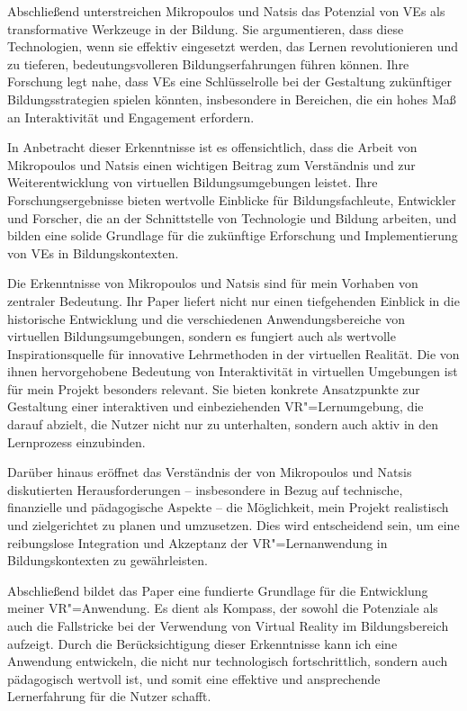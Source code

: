 \documentclass[draft]{vutinfth} %
\begin{document}
Abschließend unterstreichen Mikropoulos und Natsis das Potenzial von VEs als transformative Werkzeuge in der Bildung. Sie argumentieren, dass diese Technologien, wenn sie effektiv eingesetzt werden, das Lernen revolutionieren und zu tieferen, bedeutungsvolleren Bildungserfahrungen führen können. Ihre Forschung legt nahe, dass VEs eine Schlüsselrolle bei der Gestaltung zukünftiger Bildungsstrategien spielen könnten, insbesondere in Bereichen, die ein hohes Maß an Interaktivität und Engagement erfordern.

In Anbetracht dieser Erkenntnisse ist es offensichtlich, dass die Arbeit von Mikropoulos und Natsis einen wichtigen Beitrag zum Verständnis und zur Weiterentwicklung von virtuellen Bildungsumgebungen leistet. Ihre Forschungsergebnisse bieten wertvolle Einblicke für Bildungsfachleute, Entwickler und Forscher, die an der Schnittstelle von Technologie und Bildung arbeiten, und bilden eine solide Grundlage für die zukünftige Erforschung und Implementierung von VEs in Bildungskontexten.

Die Erkenntnisse von Mikropoulos und Natsis sind für mein Vorhaben von zentraler Bedeutung. Ihr Paper liefert nicht nur einen tiefgehenden Einblick in die historische Entwicklung und die verschiedenen Anwendungsbereiche von virtuellen Bildungsumgebungen, sondern es fungiert auch als wertvolle Inspirationsquelle für innovative Lehrmethoden in der virtuellen Realität. Die von ihnen hervorgehobene Bedeutung von Interaktivität in virtuellen Umgebungen ist für mein Projekt besonders relevant. Sie bieten konkrete Ansatzpunkte zur Gestaltung einer interaktiven und einbeziehenden VR"=Lernumgebung, die darauf abzielt, die Nutzer nicht nur zu unterhalten, sondern auch aktiv in den Lernprozess einzubinden.

Darüber hinaus eröffnet das Verständnis der von Mikropoulos und Natsis diskutierten Herausforderungen -- insbesondere in Bezug auf technische, finanzielle und pädagogische Aspekte -- die Möglichkeit, mein Projekt realistisch und zielgerichtet zu planen und umzusetzen. Dies wird entscheidend sein, um eine reibungslose Integration und Akzeptanz der VR"=Lernanwendung in Bildungskontexten zu gewährleisten.

Abschließend bildet das Paper eine fundierte Grundlage für die Entwicklung meiner VR"=Anwendung. Es dient als Kompass, der sowohl die Potenziale als auch die Fallstricke bei der Verwendung von Virtual Reality im Bildungsbereich aufzeigt. Durch die Berücksichtigung dieser Erkenntnisse kann ich eine Anwendung entwickeln, die nicht nur technologisch fortschrittlich, sondern auch pädagogisch wertvoll ist, und somit eine effektive und ansprechende Lernerfahrung für die Nutzer schafft.
\end{document}
